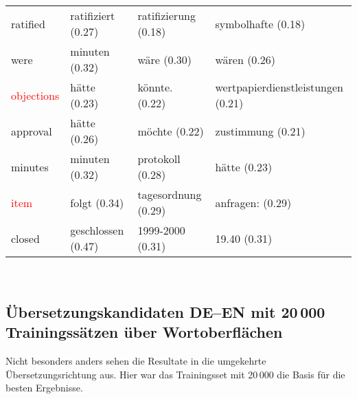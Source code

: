 \documentclass[11pt,twoside,openright]{mpreport}
\begin{document}
\begin{footnotesize}
\begin{tabular}{|llll|}
ratified                & ratifiziert (0.27) & ratifizierung (0.18) & symbolhafte (0.18) \\ %
were                    & minuten (0.32) & wäre (0.30) & wären (0.26) \\ %
\textcolor{red}{objections}              & hätte (0.23) & könnte. (0.22) & wertpapierdienstleistungen (0.21) \\
approval                & hätte (0.26) & möchte (0.22) & zustimmung (0.21) \\ %
minutes                 & minuten (0.32) & protokoll (0.28) & hätte (0.23) \\ %
\textcolor{red}{item}                    & folgt (0.34) & tagesordnung (0.29) & anfragen: (0.29) \\ %
closed                  & geschlossen (0.47) & 1999-2000 (0.31) & 19.40 (0.31) \\ %
\hline
\end{tabular}\end{footnotesize}\\



\subsection{Übersetzungskandidaten DE--EN mit 20\,000 Trainingssätzen über Wortoberflächen}
\label{sec:evalDeEn10kSurf}
Nicht besonders anders sehen die Resultate in die umgekehrte Übersetzungsrichtung aus. Hier war das Trainingsset mit 20\,000 die Basis für die besten Ergebnisse.
\end{document}
